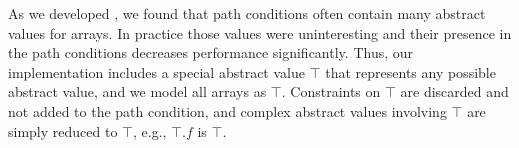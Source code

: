 


As we developed \hogarth{}, we found that path conditions often
contain many abstract values for arrays. In practice those values were
uninteresting and their presence in the path conditions decreases
performance significantly. Thus, our implementation includes a special
abstract value $\top$ that represents any possible abstract value, and
we model all arrays as $\top$. Constraints on $\top$ are discarded and
not added to the path condition, and complex abstract values involving
$\top$ are simply reduced to $\top$, e.g., $\top.f$ is $\top$.


